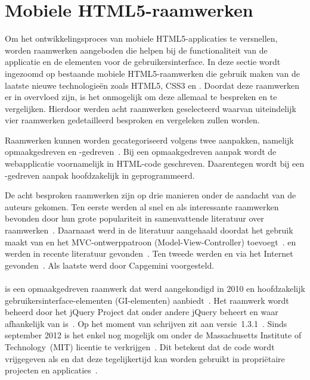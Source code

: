 \section{Mobiele HTML5-raamwerken}
\label{sec:mobiele-html5-raamwerken}

Om het ontwikkelingsproces van mobiele HTML5-applicaties te versnellen, worden raamwerken aangeboden die helpen bij de functionaliteit van de applicatie en de elementen voor de gebruikersinterface.
In deze sectie wordt ingezoomd op bestaande mobiele HTML5-raamwerken die gebruik maken van de laatste nieuwe technologieën zoals HTML5, CSS3 en \js{}.
Doordat deze raamwerken er in overvloed zijn, is het onmogelijk om deze allemaal te bespreken en te vergelijken.
Hierdoor werden acht raamwerken geselecteerd waarvan uiteindelijk vier raamwerken gedetailleerd besproken en vergeleken zullen worden.

Raamwerken kunnen worden gecategoriseerd volgens twee aanpakken, namelijk opmaakgedreven en \js{}-gedreven~\cite{Oeflman2011}.
Bij een opmaakgedreven aanpak wordt de webapplicatie voornamelijk in HTML-code geschreven. 
Daarentegen wordt bij een \js{}-gedreven aanpak hoofdzakelijk in \js{} geprogrammeerd.

De acht besproken raamwerken zijn op drie manieren onder de aandacht van de auteurs gekomen.
Ten eerste werden al snel \jqm{} en \st{} als interessante raamwerken bevonden door hun grote populariteit in samenvattende literatuur over raamwerken~\cite{Firtman2013,Hales2012,Oeflman2011,David2011}.
Daarnaast werd \tmp{} in de literatuur aangehaald doordat het gebruik maakt van \jqm{} en het MVC-ontwerppatroon (Model-View-Controller) toevoegt~\cite{Firtman2013}.
\lungo{} en \jqt{} werden in recente literatuur gevonden~\cite{Firtman2013,Hales2012}.
Ten tweede werden \kendo{} en \moobile{} via het Internet gevonden~\cite{Bristowe2012}.
Als laatste werd \davinci{} door Capgemini voorgesteld.


\paragraph{\jqm} %
\jqm{} is een opmaakgedreven raamwerk dat werd aangekondigd in 2010 en hoofdzakelijk gebruikersinterface-elementen (GI-elementen) aanbiedt~\cite{Resig2010}.
Het raamwerk wordt beheerd door het jQuery Project dat onder andere jQuery beheert en waar \jqm{} afhankelijk van is~\cite{JQuery2012}. 
Op het moment van schrijven zit \jqm{} aan versie~1.3.1~\cite{Parker2013b}. 
Sinds september 2012 is het enkel nog mogelijk om \jqm{} onder de Massachusetts Institute of Technology~(MIT) licentie te verkrijgen~\cite{Dmethvin2012}. 
Dit betekent dat de code wordt vrijgegeven als  en dat deze tegelijkertijd kan worden gebruikt in propriëtaire projecten en applicaties~\cite{PhilDutson2012}.

